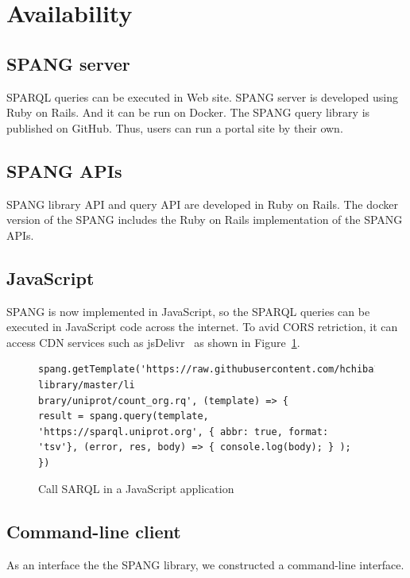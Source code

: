 \documentclass[runningheads]{llncs}
\begin{document}
\section{Availability}

\subsection{SPANG server}
SPARQL queries can be executed in Web site.
SPANG server is developed using Ruby on Rails. And it can be run on Docker. The SPANG query library is published on GitHub. Thus, users can run a portal site by their own.

\subsection{SPANG APIs}
SPANG library API and query API are developed in Ruby on Rails. The docker version of the SPANG includes the Ruby on Rails implementation of the SPANG APIs.


\subsection{JavaScript}
SPANG is now implemented in JavaScript, so the SPARQL queries can be executed in JavaScript code across the internet. To avid CORS retriction, it can access CDN services such as jsDelivr~\cite{jsdelivr} as shown in Figure~\ref{fig:jsdelivr}.



\begin{figure}[!t]
\begin{scriptsize}
\begin{verbatim}
spang.getTemplate('https://raw.githubusercontent.com/hchiba1/spang-library/master/li
brary/uniprot/count_org.rq', (template) => {
result = spang.query(template, 'https://sparql.uniprot.org', { abbr: true, format:
'tsv'}, (error, res, body) => { console.log(body); } );
})
\end{verbatim}
\end{scriptsize}
\caption{Call SARQL in a JavaScript application}
\label{fig:jsdelivr}
\end{figure}


\subsection{Command-line client}
As an interface the the SPANG library, we constructed a command-line interface.
\end{document}
